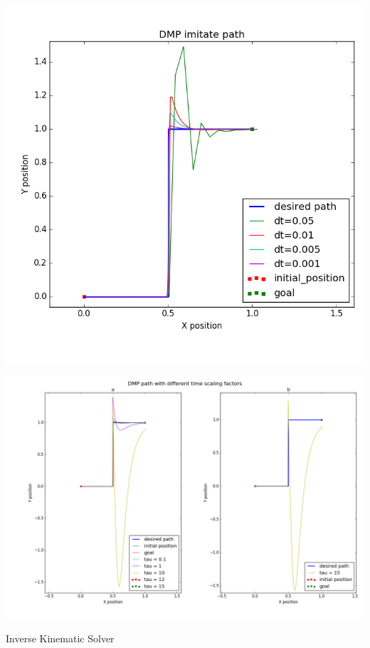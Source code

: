 \documentclass{beamer}
\begin{document}
	\begin{frame}
		\centering
		\includegraphics[scale=0.45]{images/dt_}
	\end{frame}
	
	\begin{frame}
		\includegraphics[width=\textwidth]{images/tau_}
	\end{frame}
	
	\begin{frame}{Inverse Kinematic Solver}
		
	\end{frame}
	
\end{document}

